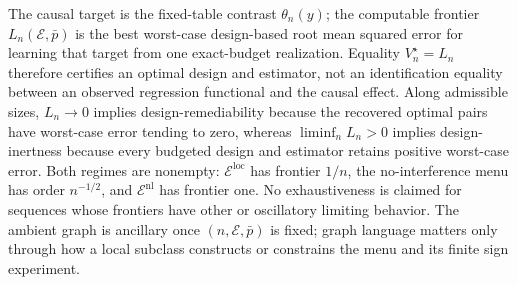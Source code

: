 The causal target is the fixed-table contrast \(\theta_n(y)\); the computable frontier \(L_n(\mathcal E,\bar p)\) is the best worst-case design-based root mean squared error for learning that target from one exact-budget realization. Equality \(V_n^\star=L_n\) therefore certifies an optimal design and estimator, not an identification equality between an observed regression functional and the causal effect. Along admissible sizes, \(L_n\to0\) implies design-remediability because the recovered optimal pairs have worst-case error tending to zero, whereas \(\liminf_nL_n>0\) implies design-inertness because every budgeted design and estimator retains positive worst-case error. Both regimes are nonempty: \(\mathcal E^{\mathrm{loc}}\) has frontier \(1/n\), the no-interference menu has order \(n^{-1/2}\), and \(\mathcal E^{\mathrm{nl}}\) has frontier one. No exhaustiveness is claimed for sequences whose frontiers have other or oscillatory limiting behavior. The ambient graph is ancillary once \((n,\mathcal E,\bar p)\) is fixed; graph language matters only through how a local subclass constructs or constrains the menu and its finite sign experiment.